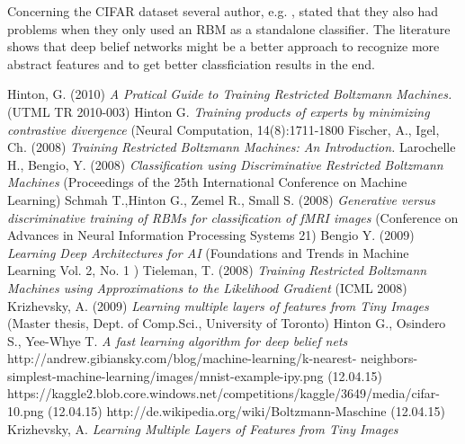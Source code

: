 \documentclass[a4paper]{scrartcl}
\begin{document}
\par Concerning the CIFAR dataset several author, e.g. \cite{cifarpaper}, stated that they also had problems when they only used an RBM as a standalone classifier. The literature shows that deep belief networks might be a better approach to recognize more abstract features and to get better classficiation results in the end.

\newpage

\begin{thebibliography}{9}
    Hinton, G. (2010) \emph{A Pratical Guide to Training Restricted 			Boltzmann Machines.} (UTML TR 2010-003)
    Hinton G. \emph{Training products of experts by minimizing contrastive divergence} (Neural Computation, 14(8):1711-1800
    Fischer, A., Igel, Ch. (2008) \emph{Training Restricted Boltzmann 		Machines: An Introduction.} 
    Larochelle H., Bengio, Y. (2008) \emph {Classification using 			Discriminative Restricted Boltzmann Machines} (Proceedings of the 25th International 			Conference on Machine Learning)
    Schmah T.,Hinton G., Zemel R., Small S. (2008) \emph{Generative 			versus discriminative training of RBMs
	for classification of fMRI images} (Conference on Advances in Neural Information 				Processing Systems 21)
    Bengio Y. (2009) \emph {Learning Deep Architectures for AI} 				(Foundations and Trends in Machine Learning
	Vol. 2, No. 1 )
    Tieleman, T. (2008) \emph{Training Restricted Boltzmann Machines 		using Approximations to
	the Likelihood Gradient} (ICML 2008)
	 Krizhevsky, A. (2009) \emph{Learning multiple layers of features 	from Tiny Images} (Master thesis, Dept. of Comp.Sci., University of 	Toronto)	
    Hinton G., Osindero S., Yee-Whye T. \emph {A fast learning 			algorithm for deep belief nets}
    http://andrew.gibiansky.com/blog/machine-learning/k-nearest-		neighbors-simplest-machine-learning/images/mnist-example-ipy.png (12.04.15)
    https://kaggle2.blob.core.windows.net/competitions/kaggle/3649/media/cifar-10.png (12.04.15)
    http://de.wikipedia.org/wiki/Boltzmann-Maschine (12.04.15)
     Krizhevsky, A. \emph{Learning Multiple Layers of Features from Tiny Images}
\end{thebibliography}
\end{document}
